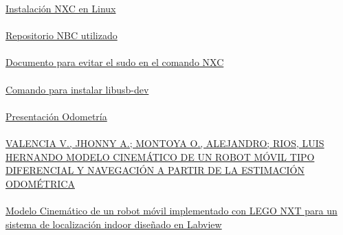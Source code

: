 \documentclass[oneside,onecolumn]{article}
\begin{document}
\begin{thebibliography}{0} %

  \href{http://ubuntudaily.blogspot.com/2011/03/using-lego-mindstorms-nxt-with-ubuntu.html}{Instalación NXC en Linux}\\\\
  \href{https://github.com/pierre-24/nbc-compiler}{Repositorio NBC utilizado}\\\\
  \href{https://bricxcc.sourceforge.net/nbc/doc/nxtlinux.txt}{Documento para evitar el sudo en el comando NXC}\\\\
  \href{https://howtoinstall.co/en/libusb-dev}{Comando para instalar libusb-dev}\\\\
  \href{http://www.kramirez.net/Robotica/Material/Presentaciones/Odometria.pdf}{Presentación Odometría}\\\\
  \href{https://www.redalyc.org/pdf/849/84916680034.pdf}{VALENCIA V., JHONNY A.; MONTOYA O., ALEJANDRO; RIOS, LUIS HERNANDO
MODELO CINEMÁTICO DE UN ROBOT MÓVIL TIPO DIFERENCIAL Y NAVEGACIÓN A PARTIR DE
LA ESTIMACIÓN ODOMÉTRICA}\\\\
  \href{https://www.google.com/url?sa=t&rct=j&q=&esrc=s&source=web&cd=&cad=rja&uact=8&ved=2ahUKEwiu0_So28_9AhViDkQIHRlXDtcQFnoECBQQAQ&url=https%3A%2F%2Frevistas.udistrital.edu.co%2Findex.php%2FTecnura%2Farticle%2Fdownload%2F6810%2F8394%2F30717&usg=AOvVaw2PsCrkFGkk_nGN-G084B11}{Modelo Cinemático de un robot móvil implementado con LEGO NXT para un sistema de localización indoor diseñado en Labview}
  
  
\end{thebibliography}

\end{document}
